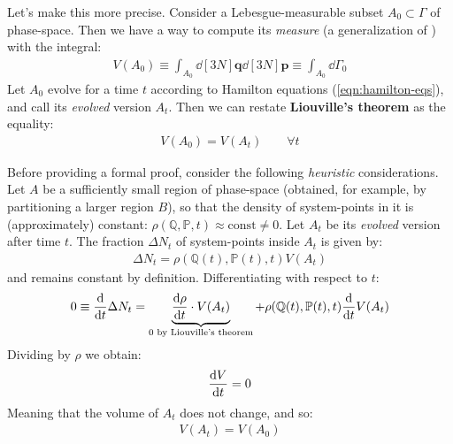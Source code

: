 \documentclass[../template.tex]{subfiles}
\begin{document}
\medskip

Let's make this more precise. Consider a Lebesgue-measurable subset $A_0 \subset \Gamma$ of phase-space. Then we have a way to compute its \textit{measure} (a generalization of ) with the integral:
\begin{align*}
    V(A_0) \equiv \int_{A_0} \dd[3N]{\bm{q}} \dd[3N]{\bm{p}} \equiv \int_{A_0} \dd{\Gamma_0}
\end{align*} 
Let $A_0$ evolve for a time $t$ according to Hamilton equations (\ref{eqn:hamilton-eqs}), and call its \textit{evolved} version $A_t$. Then we can restate \textbf{Liouville's theorem} as the equality:
\begin{align*}
    V(A_0) = V(A_t) \qquad \forall t
\end{align*} 

Before providing a formal proof, consider the following \textit{heuristic} considerations. Let $A$ be a sufficiently small region of phase-space (obtained, for example, by partitioning a larger region $B$), so that the density of system-points in it is (approximately) constant: $\rho(\mathbb{Q},\mathbb{P},t) \approx \mathrm{const} \neq 0$. Let $A_t$ be its \textit{evolved} version after time $t$. The fraction $\Delta N_t$ of system-points inside $A_t$ is given by:
\begin{align*}
    \Delta N_t = \rho(\mathbb{Q}(t), \mathbb{P}(t), t) V(A_t)
\end{align*}
and remains constant by definition. Differentiating with respect to $t$:
\begin{align*}
    0 \equiv \dv{t} \Delta N_t = \underbrace{\dv{\rho}{t} (\mathbb{Q}(t), \mathbb{P}(t), t) \cdot V(A_t)}_{0 \text{ by Liouville's theorem}} + \rho(\mathbb{Q}(t), \mathbb{P}(t), t) \dv{t} V(A_t)
\end{align*}
Dividing by $\rho$ we obtain:
\begin{align*}
    \dv{V}{t} (A_t) = 0
\end{align*}
Meaning that the volume of $A_t$ does not change, and so:
\begin{align*}
    V(A_t) = V(A_0)
\end{align*}

\medskip
\end{document}
